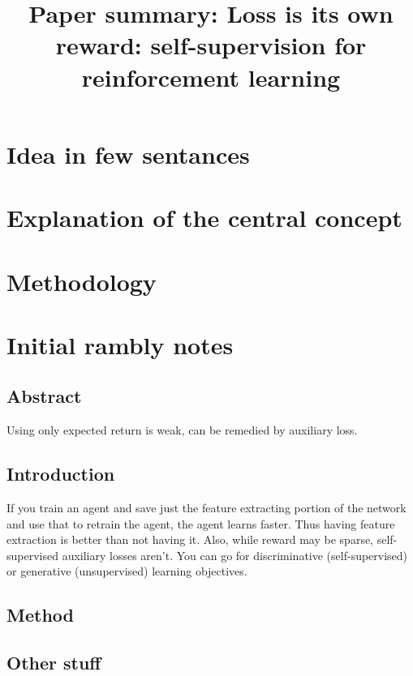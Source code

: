\documentclass{article}
\title{Paper summary: Loss is its own reward: self-supervision for reinforcement learning}
\begin{document}
\maketitle


\section{Idea in few sentances}


\section{Explanation of the central concept}

\section{Methodology}

\section{Initial rambly notes}

\subsection{Abstract}
Using only expected return is weak, can be remedied by auxiliary loss.

\subsection{Introduction}
If you train an agent and save just the feature extracting portion of the network
and use that to retrain the agent, the agent learns faster.
Thus having feature extraction is better than not having it.
Also, while reward may be sparse, self-supervised auxiliary losses aren't.
You can go for discriminative (self-supervised) or generative (unsupervised)
learning objectives.


\subsection{Method}

\subsection{Other stuff}
\end{document}

